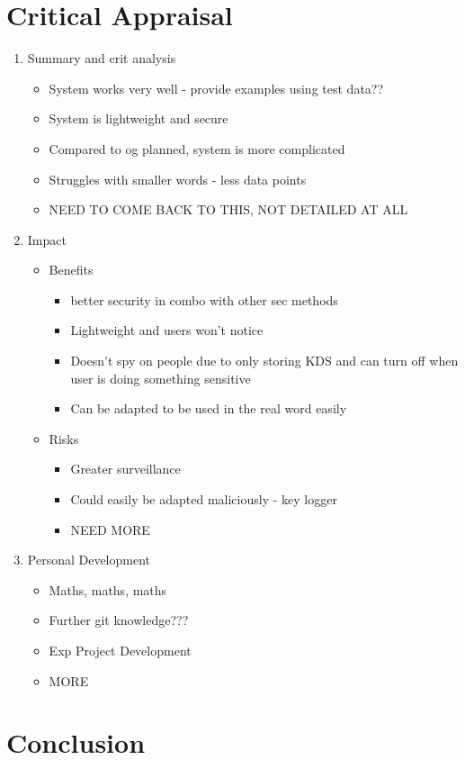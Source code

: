 \documentclass[10pt,a4paper]{report}
\begin{document}
\chapter{Critical Appraisal}
\begin{enumerate}
	\item Summary and crit analysis
	\begin{itemize}
		\item System works very well - provide examples using test data??
		\item System is lightweight and secure
		\item Compared to og planned, system is more complicated
		\item Struggles with smaller words - less data points
		\item NEED TO COME BACK TO THIS, NOT DETAILED AT ALL
	\end{itemize}
	\item Impact
	\begin{itemize}
		\item Benefits 
		\begin{itemize}
			\item better security in combo with other sec methods
			\item Lightweight and users won't notice
			\item Doesn't spy on people due to only storing KDS and can turn off when user is doing something sensitive
			\item Can be adapted to be used in the real word easily
		\end{itemize}
		\item Risks
		\begin{itemize}
			\item Greater surveillance
			\item Could easily be adapted maliciously - key logger
			\item NEED MORE
		\end{itemize}
	\end{itemize}
	\item Personal Development
	\begin{itemize}
		\item Maths, maths, maths
		\item Further git knowledge???
		\item Exp Project Development
		\item MORE
	\end{itemize}
\end{enumerate}
\chapter{Conclusion}


\end{document}
